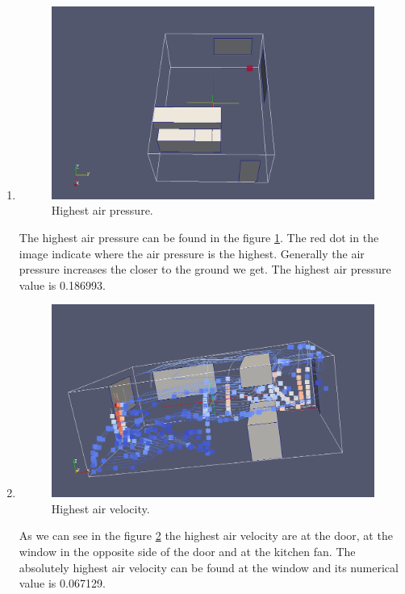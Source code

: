 \documentclass[a4paper]{article}
\begin{document}
\begin{enumerate}
    \item
        \begin{figure}[H]
            \includegraphics[width=1\linewidth]{lab5/kitchen-highest-pressure-screenshot.png}
            \caption{Highest air pressure.}
            \label{fig:pressure}
        \end{figure}
        The highest air pressure can be found in the figure \ref{fig:pressure}. The red dot
        in the image indicate where the air pressure is the highest. Generally
        the air pressure increases the closer to the ground we get. The highest
        air pressure value is 0.186993.
    \item
        \begin{figure}[H]
            \includegraphics[width=1\linewidth]{lab5/kitchen-largest-air-velocity-screenshot.png}
            \caption{Highest air velocity.}
            \label{fig:velocity}
        \end{figure}
        As we can see in the figure \ref{fig:velocity} the highest air velocity are at the
        door, at the window in the opposite side of the door and at the kitchen
        fan. The absolutely highest air velocity can be found at the window and
        its numerical value is 0.067129.
\end{enumerate}
\end{document}

